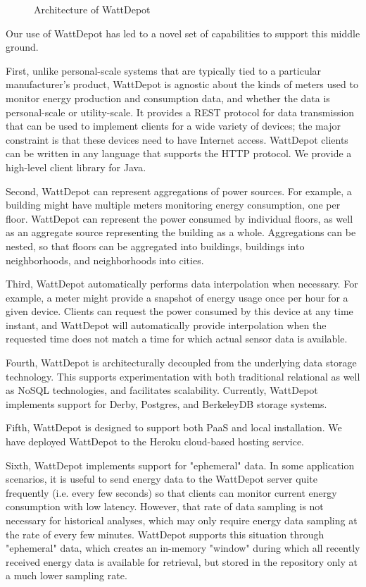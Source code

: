 \documentclass{acm_proc_article-sp}
\begin{document}
\begin{figure}
\begin{center}
\end{center}
\caption{Architecture of WattDepot}
\label{fig:wattdepot}
\end{figure}

Our use of WattDepot has led to a novel set of capabilities to support
this middle ground.

First, unlike personal-scale systems that are typically tied to a particular
manufacturer's product, WattDepot is agnostic about the kinds of meters used to monitor
energy production and consumption data, and whether the data is personal-scale or
utility-scale. It provides a REST protocol for data transmission that can be used to
implement clients for a wide variety of devices; the major constraint is that these
devices need to have Internet access. WattDepot clients can be written in any language
that supports the HTTP protocol. We provide a high-level client library for Java.

Second, WattDepot can represent aggregations of power sou\-rces. For example, a building
might have multiple meters monitoring energy consumption, one per floor. WattDepot can
represent the power consumed by individual floors, as well as an aggregate source
representing the building as a whole. Aggregations can be nested, so that floors can be
aggregated into buildings, buildings into neighborhoods, and neighborhoods into cities.

Third, WattDepot automatically performs data interpolation when necessary. For example, a
meter might provide a snapshot of energy usage once per hour for a given device. Clients
can request the power consumed by this device at any time instant, and WattDepot will
automatically provide interpolation when the requested time does not match a time for
which actual sensor data is available.

Fourth, WattDepot is architecturally decoupled from the underlying data storage
technology. This supports experimentation with both traditional relational as well as
NoSQL technologies, and facilitates scalability. Currently, WattDepot implements support
for Derby, Postgres, and BerkeleyDB storage systems.

Fifth, WattDepot is designed to support both PaaS and local installation. We have deployed
WattDepot to the Heroku cloud-based hosting service.

Sixth, WattDepot implements support for "ephemeral" data. In some application scenarios,
it is useful to send energy data to the WattDepot server quite frequently (i.e. every few
seconds) so that clients can monitor current energy consumption with low latency. However,
that rate of data sampling is not necessary for historical analyses, which may only
require energy data sampling at the rate of every few minutes. WattDepot supports this
situation through "ephemeral" data, which creates an in-memory "window" during which all
recently received energy data is available for retrieval, but stored in the repository
only at a much lower sampling rate.
\end{document}
